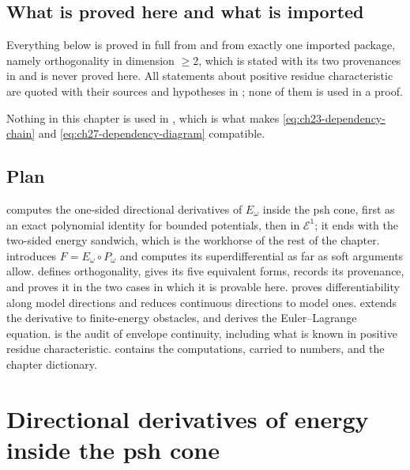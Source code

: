\subsection{What is proved here and what is imported}
\label{sec:ch27-imported}

Everything below is proved in full from
and from exactly one imported package, namely orthogonality in dimension
$\geq2$, which is stated with its two provenances in
 and is never proved here.  All
statements about positive residue characteristic are quoted with their
sources and hypotheses in ; none of them is
used in a proof.

Nothing in this chapter is used in , which is what
makes \eqref{eq:ch23-dependency-chain} and
\eqref{eq:ch27-dependency-diagram} compatible.

\subsection{Plan}
\label{sec:ch27-plan}

 computes the one-sided directional derivatives
of $E_\omega$ inside the psh cone, first as an exact polynomial identity
for bounded potentials, then in $\mathcal E^1$; it ends with the two-sided
energy sandwich, which is the workhorse of the rest of the chapter.
 introduces $F=E_\omega\circ P_\omega$
and computes its superdifferential as far as soft arguments allow.
 defines orthogonality, gives its five
equivalent forms, records its provenance, and proves it in the two cases in
which it is provable here.   proves
differentiability along model directions and
 reduces continuous directions to model
ones.   extends the derivative to
finite-energy obstacles, and  derives the
Euler--Lagrange equation.   is the audit of
envelope continuity, including what is known in positive residue
characteristic.   contains the computations, carried
to numbers, and  the chapter dictionary.

\section{Directional derivatives of energy inside the psh cone}
\label{sec:ch27-directional}

